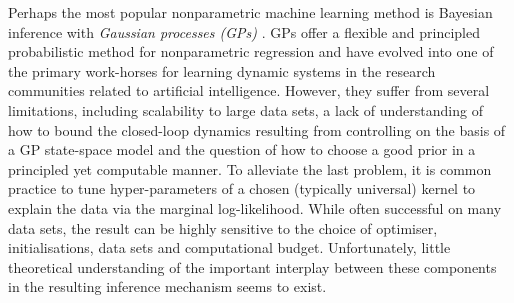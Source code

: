 \documentclass{article} %
\theoremstyle{definition}
\theoremstyle{remark}
\begin{document}
Perhaps the most popular nonparametric machine learning method is Bayesian inference with \textit{Gaussian processes (GPs)} \cite{GPbook:2006}. GPs offer a flexible and principled probabilistic method for nonparametric regression and have evolved into one of the primary work-horses for learning dynamic systems \cite{Deisenroth2009,Deisenroth2011,Deisenroth2015,Tuongmodellearningsurvey2011,deisenrothsurvey2013,McHutchonthesis2014} in the research communities related to artificial intelligence. 
However, they suffer from several limitations, including scalability to large data sets, a lack of understanding of how to bound the closed-loop dynamics resulting from controlling on the basis of a GP state-space model and the question of how to choose a good prior in a principled yet computable manner. To alleviate the last problem, it is common practice to tune hyper-parameters of a chosen (typically universal) kernel to explain the data via the marginal log-likelihood. While often successful on many data sets, the result can be highly sensitive to the choice of optimiser, initialisations, data sets and computational budget. Unfortunately, little theoretical understanding of the important interplay between these components in the resulting inference mechanism seems to exist.
%
\end{document}
